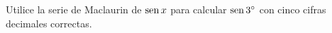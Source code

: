 \item Utilice la serie de Maclaurin de $\operatorname{sen} x$ para calcular $\operatorname{sen} 3^\circ$ con cinco cifras decimales correctas.
